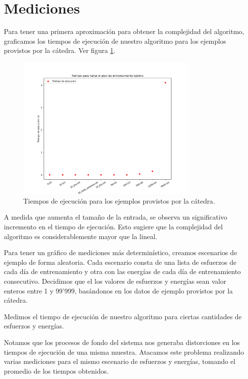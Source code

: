 \section{Mediciones}

Para tener una primera aproximación para obtener la complejidad del algoritmo, graficamos los tiempos de ejecución
de nuestro algoritmo para los ejemplos provistos por la cátedra. Ver figura \ref{fig:tiempos_ejemplos}.

\begin{figure}[H]
    \centering
    \includegraphics[width=0.8\textwidth]{img/tiempos_catedra.png}
    \caption{Tiempos de ejecución para los ejemplos provistos por la cátedra.}
    \label{fig:tiempos_ejemplos}
\end{figure}

A medida que aumenta el tamaño de la entrada, se observa un significativo incremento en el tiempo de ejecución.
Esto sugiere que la complejidad del algoritmo es considerablemente mayor que la lineal.

Para tener un gráfico de mediciones más determinístico, creamos escenarios de ejemplo de forma aleatoria. Cada escenario consta de
una lista de esfuerzos de cada día de entrenamiento y otra con las energías de cada día de
entrenamiento consecutivo. Decidimos que el los valores de esfuerzos y energías sean valor enteros
entre 1 y 99'999, basándonos en los datos de ejemplo provistos por la cátedra.

Medimos el tiempo de ejecución de nuestro algoritmo para ciertas cantidades de esfuerzos y energías.

Notamos que los procesos de fondo del sistema nos generaba distorciones en los tiempos de ejecución
de una misma muestra. Atacamos este problema realizando varias mediciones para el mismo escenario de
esfuerzos y energías, tomando el promedio de los tiempos obtenidos.

